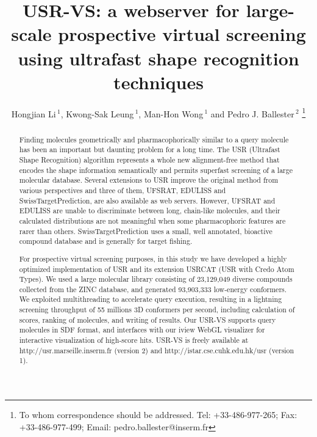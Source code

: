 \documentclass[a4,center,fleqn]{NAR}
\begin{document}
\title{USR-VS: a webserver for large-scale prospective virtual screening using ultrafast shape recognition techniques}

\author{
Hongjian Li\,$^{1}$,
Kwong-Sak Leung\,$^{1}$,
Man-Hon Wong\,$^{1}$
and Pedro J. Ballester\,$^{2}$
\footnote{To whom correspondence should be addressed.
Tel: +33-486-977-265; Fax: +33-486-977-499; Email: pedro.ballester@inserm.fr}}

\address{
$^{1}$Department of Computer Science and Engineering, Chinese University of Hong Kong, Sha Tin, New Territories, Hong Kong.
and
$^{2}$Cancer Research Center of Marseille, INSERM U1068, F-13009, Marseille, France. Institut Paoli-Calmettes, F-13009, Marseille, France. Aix-Marseille Université, F-13284, Marseille, France. CNRS UMR7258, F-13009, Marseille, France.}


\maketitle

\begin{abstract}

Finding molecules geometrically and pharmacophorically similar to a query molecule has been an important but daunting problem for a long time. The USR (Ultrafast Shape Recognition) algorithm represents a whole new alignment-free method that encodes the shape information semantically and permits superfast screening of a large molecular database. Several extensions to USR improve the original method from various perspectives and three of them, UFSRAT, EDULISS and SwissTargetPrediction, are also available as web servers. However, UFSRAT and EDULISS are unable to discriminate between long, chain-like molecules, and their calculated distributions are not meaningful when some pharmacophoric features are rarer than others. SwissTargetPrediction uses a small, well annotated, bioactive compound database and is generally for target fishing.

For prospective virtual screening purposes, in this study we have developed a highly optimized implementation of USR and its extension USRCAT (USR with Credo Atom Types). We used a large molecular library consisting of 23,129,049 diverse compounds collected from the ZINC database, and generated 93,903,333 low-energy conformers. We exploited multithreading to accelerate query execution, resulting in a lightning screening throughput of 55 millions 3D conformers per second, including calculation of scores, ranking of molecules, and writing of results. Our USR-VS supports query molecules in SDF format, and interfaces with our iview WebGL visualizer for interactive visualization of high-score hits. USR-VS is freely available at http://usr.marseille.inserm.fr (version 2) and http://istar.cse.cuhk.edu.hk/usr (version 1).

\end{abstract}
\end{document}
